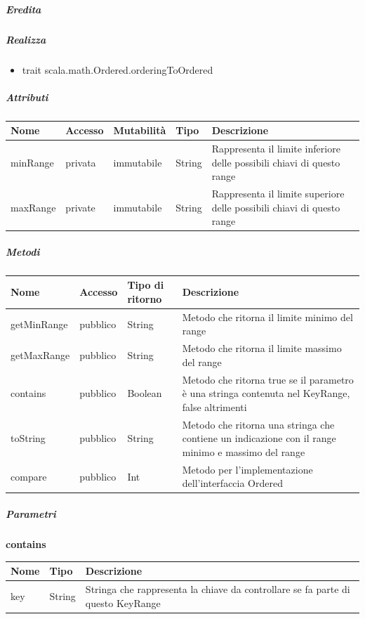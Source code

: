 \documentclass{scalatekids-article}
\begin{document}
\subparagraph{Eredita}

\subparagraph{Realizza}
\begin{itemize}
  \item trait scala.math.Ordered.orderingToOrdered
\end{itemize}

\subparagraph{Attributi}
\begin{tabular}{| p{3cm} | p{1.5cm} | p{2cm} | p{2cm} | p{8.5cm} |}
  \hline
  Nome & Accesso & Mutabilità & Tipo & Descrizione\\
  \hline
  minRange & privata & immutabile & String & Rappresenta il limite inferiore delle possibili chiavi di questo range \\
  \hline
  maxRange & private & immutabile & String & Rappresenta il limite superiore delle possibili chiavi di questo range \\
  \hline
\end{tabular}

\subparagraph{Metodi} %
\begin{tabular}{| p{3cm} | p{1.5cm} | p{3.5cm} | p{9cm} |}
  \hline
  Nome & Accesso & Tipo di ritorno & Descrizione\\
  \hline
  getMinRange & pubblico & String & Metodo che ritorna il limite minimo del range \\
  \hline
  getMaxRange & pubblico & String & Metodo che ritorna il limite massimo del range \\
  \hline
  contains & pubblico & Boolean & Metodo che ritorna true se il parametro è una stringa contenuta nel KeyRange, false altrimenti\\
  \hline
  toString & pubblico & String & Metodo che ritorna una stringa che contiene un indicazione con il range minimo e massimo del range\\
  \hline
  compare & pubblico & Int & Metodo per l'implementazione dell'interfaccia Ordered\\
  \hline
\end{tabular}

\subparagraph{Parametri}
\begin{center}
  \textbf{contains}\\
\end{center}
\begin{tabular}{| l | l | l |}
  \hline
  Nome & Tipo & Descrizione\\
  \hline
  key & String & Stringa che rappresenta la chiave da controllare se fa parte di questo KeyRange \\
  \hline
\end{tabular}
\end{document}
